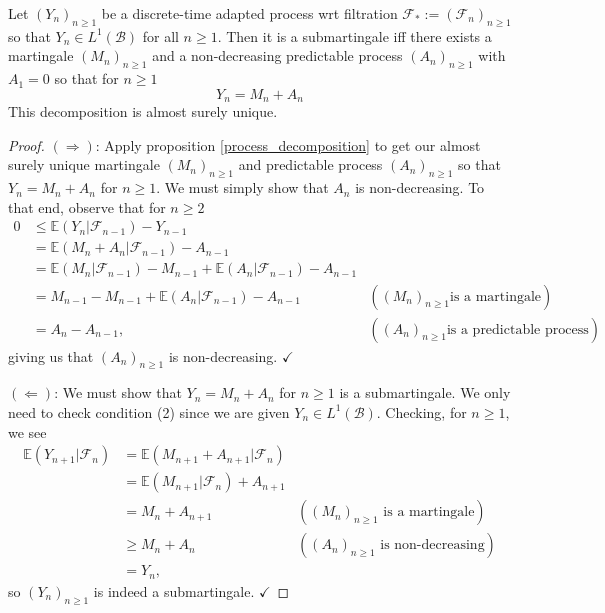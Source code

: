 \begin{corollary}
    \label{doob_decomposition}
    Let \((Y_{n})_{n \geq 1}\) be a discrete-time adapted process wrt filtration \(\mathcal{F}_{*} := (\mathcal{F}_{n})_{n \geq 1}\) so that \(Y_{n} \in L^{1}(\mathcal{B})\) for all \(n \geq 1\). Then it is a submartingale iff there exists a martingale \((M_{n})_{n \geq 1}\) and a non-decreasing predictable process \((A_{n})_{n \geq 1}\) with \(A_{1} = 0\) so that for \(n \geq 1\)
    \[Y_{n} = M_{n} + A_{n}\]
    This decomposition is almost surely unique.
\end{corollary}

\begin{proof}
    \((\Rightarrow)\): Apply proposition \ref{process_decomposition} to get our almost surely unique martingale \((M_{n})_{n \geq 1}\) and predictable process \((A_{n})_{n \geq 1}\) so that \(Y_{n} = M_{n} + A_{n}\) for \(n \geq 1\). We must simply show that \(A_{n}\) is non-decreasing. To that end, observe that for \(n \geq 2\)
    \begin{align*}
        0 &\leq \mathbb{E}(Y_{n}|\mathcal{F}_{n-1}) - Y_{n-1} \\
        &= \mathbb{E}(M_{n} + A_{n}|\mathcal{F}_{n-1}) - A_{n-1} \\
        &= \mathbb{E}(M_{n}|\mathcal{F}_{n-1})  - M_{n-1} + \mathbb{E}(A_{n}|\mathcal{F}_{n-1}) - A_{n-1} \\
        &= M_{n-1} - M_{n-1} + \mathbb{E}(A_{n}|\mathcal{F}_{n-1}) - A_{n-1} &((M_{n})_{n \geq 1} \text{is a martingale}) \\
        &=A_{n}- A_{n-1}, &((A_{n})_{n \geq 1} \text{is a predictable process})
    \end{align*}
    giving us that \((A_{n})_{n \geq 1}\) is non-decreasing. \(\checkmark\)

    \((\Leftarrow)\): We must show that \(Y_{n} = M_{n} + A_{n}\) for \(n \geq 1\) is a submartingale. We only need to check condition (2) since we are given \(Y_{n} \in L^{1}(\mathcal{B})\). Checking, for \(n \geq 1\), we see
    \begin{align*}
        \mathbb{E}(Y_{n+1}|\mathcal{F}_{n}) &= \mathbb{E}(M_{n+1} + A_{n+1}|\mathcal{F}_{n}) \\
        &= \mathbb{E}(M_{n+1}|\mathcal{F}_{n}) + A_{n+1} \\
        &= M_{n} + A_{n+1} & ((M_{n})_{n \geq 1} \text{ is a martingale})\\
        &\geq M_{n} + A_{n} & ((A_{n})_{n \geq 1} \text{ is non-decreasing})\\
        &= Y_{n},
    \end{align*}
    so \((Y_{n})_{n \geq 1}\) is indeed a submartingale. \(\checkmark\)
\end{proof}


